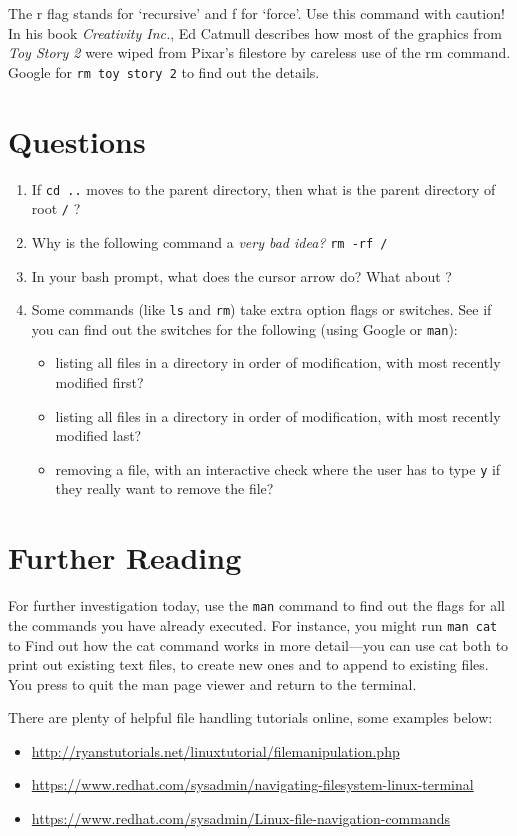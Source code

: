 \documentclass{article}
\begin{document}
The r flag stands for `recursive' and f for `force'. Use this command with caution! In his book \textit{Creativity Inc.}, Ed Catmull describes how most of the graphics from \textit{Toy Story 2} were wiped from Pixar's filestore by careless use of the rm command. Google for \texttt{rm toy story 2} to find out the details.

\section*{Questions}

\begin{enumerate}
\item If \texttt{cd ..} moves to the parent directory, then what is the parent directory of root \texttt{/} ?
\item Why is the following command a \emph{very bad idea?} \texttt{rm -rf /}
\item In your bash prompt, what does the \keys{\arrowkeyup}  cursor arrow do? What about \keys{\arrowkeydown}?
\item Some commands (like \texttt{ls} and \texttt{rm}) take extra option flags or switches. See if you can find out the switches for the following (using Google or \texttt{man}):
  \begin{itemize}
  \item listing all files in a directory in order of modification, with most recently modified first?
  \item listing all files in a directory in order of modification, with most recently modified last?
  \item removing a file, with an interactive check where the user has to type \texttt{y} if they really want to remove the file?
  \end{itemize}
\end{enumerate}


\section*{Further Reading}

For further investigation today, use the \texttt{man} command to find out 
the flags for all the commands you have already executed.
For instance, you might run \texttt{man cat} to Find out how the cat command works in more detail---you can use cat both to print out existing text files, to create new ones and to append to existing files.
You press  to quit the man page viewer and return to the terminal.

There are plenty of helpful file handling tutorials online, some examples
below:
\begin{itemize}
\item \url{http://ryanstutorials.net/linuxtutorial/filemanipulation.php}
\item \url{https://www.redhat.com/sysadmin/navigating-filesystem-linux-terminal}
\item \url{https://www.redhat.com/sysadmin/Linux-file-navigation-commands}
\end{itemize}
  
  
\end{document}
